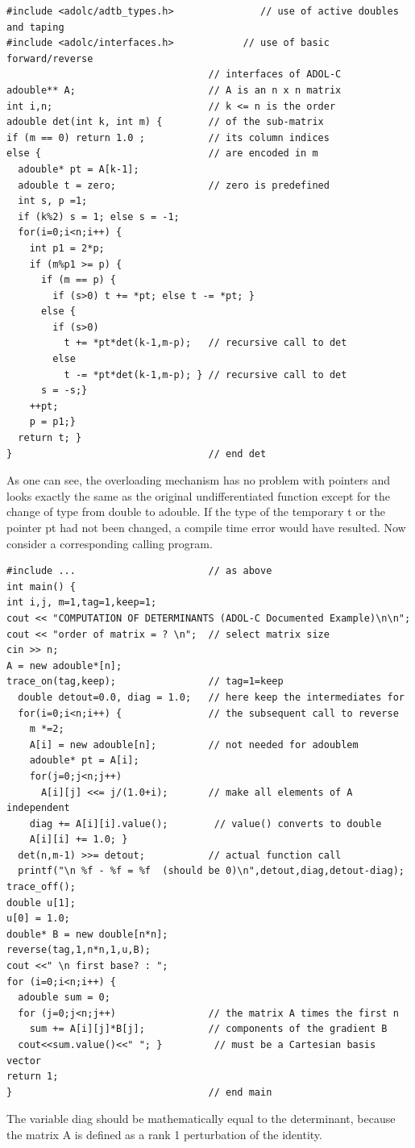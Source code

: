 \documentclass[11pt,twoside]{article}
\begin{document}
\begin{verbatim}
#include <adolc/adtb_types.h>               // use of active doubles and taping
#include <adolc/interfaces.h>            // use of basic forward/reverse
                                   // interfaces of ADOL-C
adouble** A;                       // A is an n x n matrix
int i,n;                           // k <= n is the order
adouble det(int k, int m) {        // of the sub-matrix
if (m == 0) return 1.0 ;           // its column indices
else {                             // are encoded in m
  adouble* pt = A[k-1];
  adouble t = zero;                // zero is predefined
  int s, p =1;
  if (k%2) s = 1; else s = -1;
  for(i=0;i<n;i++) {
    int p1 = 2*p;
    if (m%p1 >= p) {
      if (m == p) {
        if (s>0) t += *pt; else t -= *pt; }
      else {
        if (s>0)
          t += *pt*det(k-1,m-p);   // recursive call to det
        else
          t -= *pt*det(k-1,m-p); } // recursive call to det
      s = -s;}
    ++pt;
    p = p1;}
  return t; }
}                                  // end det
\end{verbatim}
As one can see, the overloading mechanism has no problem with pointers
and looks exactly the same as the original undifferentiated function
except for the change of type from {\sf double} to {\sf adouble}.
If the type of the temporary {\sf t} or the pointer {\sf pt} had not been changed,
a compile time error would have resulted. Now consider a corresponding
calling program.

\begin{verbatim}
#include ...                       // as above
int main() {
int i,j, m=1,tag=1,keep=1;
cout << "COMPUTATION OF DETERMINANTS (ADOL-C Documented Example)\n\n";
cout << "order of matrix = ? \n";  // select matrix size
cin >> n;
A = new adouble*[n];              
trace_on(tag,keep);                // tag=1=keep
  double detout=0.0, diag = 1.0;   // here keep the intermediates for
  for(i=0;i<n;i++) {               // the subsequent call to reverse
    m *=2;
    A[i] = new adouble[n];         // not needed for adoublem
    adouble* pt = A[i];
    for(j=0;j<n;j++)
      A[i][j] <<= j/(1.0+i);       // make all elements of A independent
    diag += A[i][i].value();        // value() converts to double
    A[i][i] += 1.0; }
  det(n,m-1) >>= detout;           // actual function call 
  printf("\n %f - %f = %f  (should be 0)\n",detout,diag,detout-diag);
trace_off();
double u[1];
u[0] = 1.0;
double* B = new double[n*n];
reverse(tag,1,n*n,1,u,B);
cout <<" \n first base? : ";
for (i=0;i<n;i++) {
  adouble sum = 0;
  for (j=0;j<n;j++)                // the matrix A times the first n
    sum += A[i][j]*B[j];           // components of the gradient B
  cout<<sum.value()<<" "; }         // must be a Cartesian basis vector
return 1;
}                                  // end main
\end{verbatim}
The variable {\sf diag} should be mathematically 
equal to the determinant, because the
matrix {\sf A} is defined as a rank 1 perturbation of the identity.
%
\end{document}
